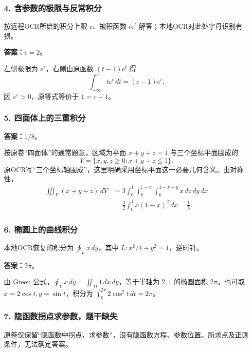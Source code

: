 \documentclass[11pt,fontset=fandol]{ctexart}
\begin{document}
\subsubsection{4.
含参数的极限与反常积分}\label{ux542bux53c2ux6570ux7684ux6781ux9650ux4e0eux53cdux5e38ux79efux5206}

按远程OCR所给的积分上限 \(c\)、被积函数 \(te^t\)
解答；本地OCR对此处字母识别有损。

\textbf{答案：}\(c=2\)。

左侧极限为 \(e^c\)，右侧由原函数 \((t-1)e^t\) 得 \[
\int_{-\infty}^cte^t\,dt=(c-1)e^c.
\] 因 \(e^c>0\)，原等式等价于 \(1=c-1\)。

\subsubsection{5.
四面体上的三重积分}\label{ux56dbux9762ux4f53ux4e0aux7684ux4e09ux91cdux79efux5206}

\textbf{答案：}\(1/8\)。

按原卷``四面体''的通常题意，区域为平面 \(x+y+z=1\) 与三个坐标平面围成的
\[
V=\{x,y,z\ge0:x+y+z\le1\}.
\]
原OCR写``三个坐标轴围成''，这里明确采用坐标平面这一必要几何含义。由对称性，
\[
\begin{aligned}
\iiint_V(x+y+z)\,dV
&=3\int_0^1\int_0^{1-x}\int_0^{1-x-y}x\,dz\,dy\,dx\\
&=\frac32\int_0^1x(1-x)^2\,dx=\frac18.
\end{aligned}
\]

\subsubsection{6.
椭圆上的曲线积分}\label{ux692dux5706ux4e0aux7684ux66f2ux7ebfux79efux5206}

本地OCR恢复的积分为 \(\oint_Lx\,dy\)，其中 \(L:x^2/4+y^2=1\)，逆时针。

\textbf{答案：}\(2\pi\)。

由 Green 公式，\(\oint_Lx\,dy=\iint_D1\,dx\,dy\)，等于半轴为 \(2,1\)
的椭圆面积 \(2\pi\)。也可取 \(x=2\cos t,y=\sin t\)，积分为
\(\int_0^{2\pi}2\cos^2t\,dt=2\pi\)。

\subsubsection{7.
隐函数拐点求参数，题干缺失}\label{ux9690ux51fdux6570ux62d0ux70b9ux6c42ux53c2ux6570ux9898ux5e72ux7f3aux5931}

原卷仅保留``隐函数中拐点，求参数''，没有隐函数方程、参数位置、所求点及正则条件，无法确定答案。
\end{document}
